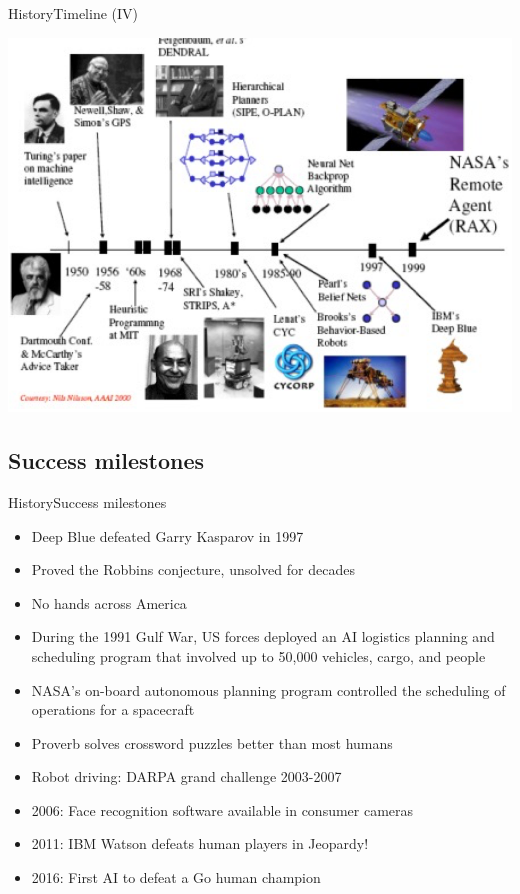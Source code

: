 \documentclass[10pt,compress]{beamer} %
\begin{document}
\begin{frame}{History}{Timeline (IV)}
	\begin{center}
		\includegraphics[width=0.8\linewidth]{figs/history.png}
	\end{center}
\end{frame}

\subsection{Success milestones}
\begin{frame}{History}{Success milestones}
	\begin{itemize}
	\item Deep Blue defeated Garry Kasparov in 1997 
	\item Proved the Robbins conjecture, unsolved for decades 
	\item No hands across America 
	\item During the 1991 Gulf War, US forces deployed an AI logistics planning and scheduling program that involved up to 50,000 vehicles, cargo, and people 
	\item NASA's on-board autonomous planning program controlled the scheduling of operations for a spacecraft 
	\item Proverb solves crossword puzzles better than most humans
	\item Robot driving: DARPA grand challenge 2003-2007
	\item 2006: Face recognition software available in consumer cameras
	\item 2011: IBM Watson defeats human players in Jeopardy!
	\item 2016: First AI to defeat a Go human champion
	\end{itemize}
\end{frame}
\end{document}
